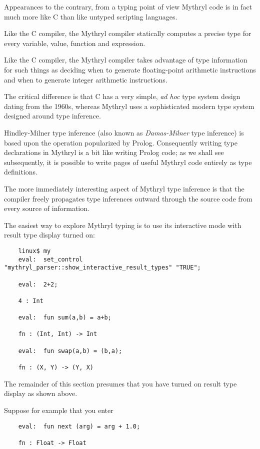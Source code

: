 Appearances to the contrary, from a typing point of view Mythryl code 
is in fact much more like C than like untyped scripting languages.

Like the C compiler, the Mythryl compiler statically computes a 
precise type for every variable, value, function and expression.

Like the C compiler, the Mythryl compiler takes advantage of type 
information for such things as deciding when to generate 
floating-point arithmetic instructions and when to generate integer 
arithmetic instructions.

The critical difference is that C has a very simple, {\it ad hoc} 
type system design dating from the 1960s, whereas Mythryl uses a 
sophisticated modern type system designed around  type inference.

Hindley-Milner type inference 
(also known as {\it Damas-Milner} type inference) is based upon the 
 operation 
popularized by Prolog.  Consequently writing type declarations in Mythryl is a bit 
like writing Prolog code;  as we shall see subsequently, it is possible 
to write pages of useful Mythryl code entirely as type definitions.

The more immediately interesting aspect of Mythryl type inference is that 
the compiler freely propagates type inferences outward through the source 
code from every source of information.

The easiest way to explore Mythryl typing is to use its interactive mode 
with result type display turned on:

\begin{verbatim}
    linux$ my
    eval:  set_control  "mythryl_parser::show_interactive_result_types" "TRUE";

    eval:  2+2;

    4 : Int

    eval:  fun sum(a,b) = a+b;

    fn : (Int, Int) -> Int

    eval:  fun swap(a,b) = (b,a);

    fn : (X, Y) -> (Y, X)

\end{verbatim}

The remainder of this section presumes that you have turned on 
result type display as shown above.

Suppose for example that you enter

\begin{verbatim}
    eval:  fun next (arg) = arg + 1.0;

    fn : Float -> Float
\end{verbatim}

